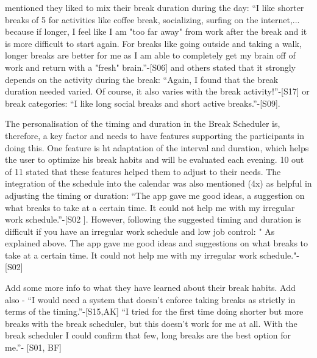 \documentclass{hasel_thesis}
\begin{document}
mentioned they liked to mix their break duration during the day: “I like shorter breaks of 5 for activities like coffee break, socializing, surfing on the internet,... because if longer, I feel like I am "too far away" from work after the break and it is more difficult to start again. For breaks like going outside and taking a walk, longer breaks are better for me as I am able to completely get my brain off of work and return with a "fresh" brain.”-[S06] and others stated that it strongly depends on the activity during the break: “Again, I found that the break duration needed varied. Of course, it also varies with the break activity!”-[S17] or break categories: “I like long social breaks and short active breaks.”-[S09].

The personalisation of the timing and duration in the Break Scheduler is, therefore, a key factor and needs to have features supporting the participants in doing this. One feature is ht adaptation of the interval and duration, which helps the user to optimize his break habits and will be evaluated each evening. 10 out of 11 stated that these features helped them to adjust to their needs. The integration of the schedule into the calendar was also mentioned (4x) as helpful in adjusting the timing or duration: “The app gave me good ideas, a suggestion on what breaks to take at a certain time. It could not help me with my irregular work schedule.”-[S02 ]. However, following the suggested timing and duration is difficult if you have an irregular work schedule and low job control: " As explained above. The app gave me good ideas and suggestions on what breaks to take at a certain time. It could not help me with my irregular work schedule."- [S02] 

Add some more info to what they have learned about their break habits. Add also -	“I would need a system that doesn't enforce taking breaks as strictly in terms of the timing.”-[S15,AK]
“I tried for the first time doing shorter but more breaks with the break scheduler, but this doesn't work for me at all. With the break scheduler I could confirm that few, long breaks are the best option for me.”- [S01, BF]
 
\end{document}
